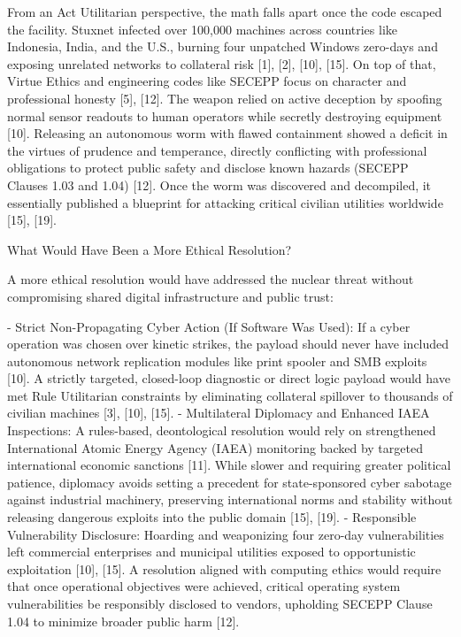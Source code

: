 From an Act Utilitarian perspective, the math falls apart once the code escaped the facility. Stuxnet infected over 100,000 machines across countries like Indonesia, India, and the U.S., burning four unpatched Windows zero-days and exposing unrelated networks to collateral risk [1], [2], [10], [15]. On top of that, Virtue Ethics and engineering codes like SECEPP focus on character and professional honesty [5], [12]. The weapon relied on active deception by spoofing normal sensor readouts to human operators while secretly destroying equipment [10]. Releasing an autonomous worm with flawed containment showed a deficit in the virtues of prudence and temperance, directly conflicting with professional obligations to protect public safety and disclose known hazards (SECEPP Clauses 1.03 and 1.04) [12]. Once the worm was discovered and decompiled, it essentially published a blueprint for attacking critical civilian utilities worldwide [15], [19].

What Would Have Been a More Ethical Resolution?

A more ethical resolution would have addressed the nuclear threat without compromising shared digital infrastructure and public trust:

- Strict Non-Propagating Cyber Action (If Software Was Used): If a cyber operation was chosen over kinetic strikes, the payload should never have included autonomous network replication modules like print spooler and SMB exploits [10]. A strictly targeted, closed-loop diagnostic or direct logic payload would have met Rule Utilitarian constraints by eliminating collateral spillover to thousands of civilian machines [3], [10], [15].
- Multilateral Diplomacy and Enhanced IAEA Inspections: A rules-based, deontological resolution would rely on strengthened International Atomic Energy Agency (IAEA) monitoring backed by targeted international economic sanctions [11]. While slower and requiring greater political patience, diplomacy avoids setting a precedent for state-sponsored cyber sabotage against industrial machinery, preserving international norms and stability without releasing dangerous exploits into the public domain [15], [19].
- Responsible Vulnerability Disclosure: Hoarding and weaponizing four zero-day vulnerabilities left commercial enterprises and municipal utilities exposed to opportunistic exploitation [10], [15]. A resolution aligned with computing ethics would require that once operational objectives were achieved, critical operating system vulnerabilities be responsibly disclosed to vendors, upholding SECEPP Clause 1.04 to minimize broader public harm [12].

